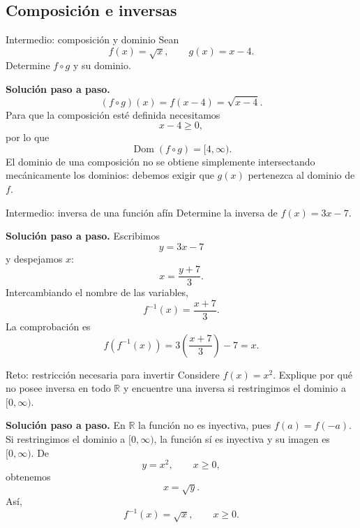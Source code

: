 \documentclass[aspectratio=169,10pt]{beamer}
\newcommand{\R}{\mathbb{R}}
\newcommand{\Dom}{\operatorname{Dom}}
\begin{document}
\subsection{Composición e inversas}

\begin{frame}{Intermedio: composición y dominio}
Sean
\[
f(x)=\sqrt{x},\qquad g(x)=x-4.
\]
Determine $f\circ g$ y su dominio.

\textbf{Solución paso a paso.}
\[
(f\circ g)(x)=f(x-4)=\sqrt{x-4}.
\]
Para que la composición esté definida necesitamos
\[
x-4\ge0,
\]
por lo que
\[
\boxed{\Dom(f\circ g)=[4,\infty)}.
\]
El dominio de una composición no se obtiene simplemente intersectando mecánicamente los dominios: debemos exigir que $g(x)$ pertenezca al dominio de $f$.
\end{frame}

\begin{frame}{Intermedio: inversa de una función afín}
Determine la inversa de $f(x)=3x-7$.

\textbf{Solución paso a paso.} Escribimos
\[
y=3x-7
\]
y despejamos $x$:
\[
x=\frac{y+7}{3}.
\]
Intercambiando el nombre de las variables,
\[
\boxed{f^{-1}(x)=\frac{x+7}{3}}.
\]
La comprobación es
\[
f(f^{-1}(x))=3\left(\frac{x+7}{3}\right)-7=x.
\]
\end{frame}

\begin{frame}{Reto: restricción necesaria para invertir}
Considere $f(x)=x^2$. Explique por qué no posee inversa en todo $\R$ y encuentre una inversa si restringimos el dominio a $[0,\infty)$.

\textbf{Solución paso a paso.} En $\R$ la función no es inyectiva, pues $f(a)=f(-a)$. Si restringimos el dominio a $[0,\infty)$, la función sí es inyectiva y su imagen es $[0,\infty)$. De
\[
y=x^2,\qquad x\ge0,
\]
obtenemos
\[
x=\sqrt{y}.
\]
Así,
\[
\boxed{f^{-1}(x)=\sqrt{x},\qquad x\ge0}.
\]
\end{frame}
\end{document}
